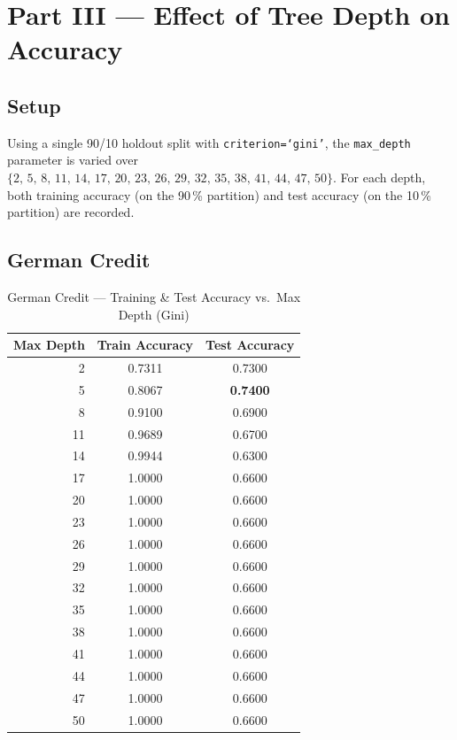 \documentclass[12pt,a4paper]{article}
\begin{document}
\section{Part III --- Effect of Tree Depth on Accuracy}

\subsection{Setup}

Using a single 90/10 holdout split with \texttt{criterion=`gini'}, the
\texttt{max\_depth} parameter is varied over
$\{2,\,5,\,8,\,11,\,14,\,17,\,20,\,23,\,26,\,29,\,32,\,35,\,38,\,41,\,44,\,47,\,50\}$.
For each depth, both training accuracy (on the 90\,\% partition) and
test accuracy (on the 10\,\% partition) are recorded.

\subsection{German Credit}

\begin{table}[H]
\centering
\caption{German Credit --- Training \& Test Accuracy vs.\ Max Depth (Gini)}
\label{tab:ger_depth}
\begin{tabular}{@{}rcc@{}}
\toprule
\textbf{Max Depth} & \textbf{Train Accuracy} & \textbf{Test Accuracy} \\
\midrule
 2 & 0.7311 & 0.7300 \\
 5 & 0.8067 & \textbf{0.7400} \\
 8 & 0.9100 & 0.6900 \\
11 & 0.9689 & 0.6700 \\
14 & 0.9944 & 0.6300 \\
17 & 1.0000 & 0.6600 \\
20 & 1.0000 & 0.6600 \\
23 & 1.0000 & 0.6600 \\
26 & 1.0000 & 0.6600 \\
29 & 1.0000 & 0.6600 \\
32 & 1.0000 & 0.6600 \\
35 & 1.0000 & 0.6600 \\
38 & 1.0000 & 0.6600 \\
41 & 1.0000 & 0.6600 \\
44 & 1.0000 & 0.6600 \\
47 & 1.0000 & 0.6600 \\
50 & 1.0000 & 0.6600 \\
\bottomrule
\end{tabular}
\end{table}
\end{document}
